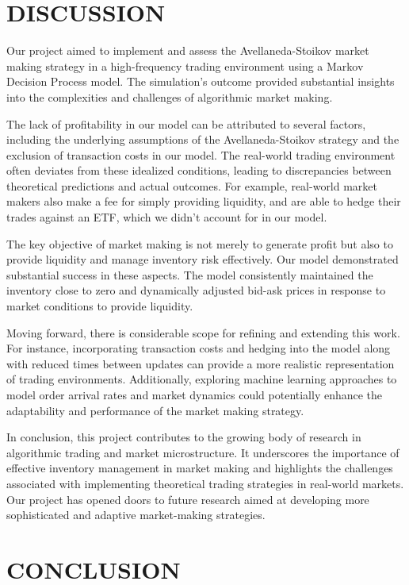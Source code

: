 \documentclass[letterpaper, 10 pt, conference]{ieeeconf}  %
\begin{document}
\section{DISCUSSION}

Our project aimed to implement and assess the Avellaneda-Stoikov market making strategy in a high-frequency trading environment using a Markov Decision Process model. The simulation's outcome provided substantial insights into the complexities and challenges of algorithmic market making.

The lack of profitability in our model can be attributed to several factors, including the underlying assumptions of the Avellaneda-Stoikov strategy and the exclusion of transaction costs in our model. The real-world trading environment often deviates from these idealized conditions, leading to discrepancies between theoretical predictions and actual outcomes. For example, real-world market makers also make a fee for simply providing liquidity, and are able to hedge their trades against an ETF, which we didn't account for in our model. 

The key objective of market making is not merely to generate profit but also to provide liquidity and manage inventory risk effectively. Our model demonstrated substantial success in these aspects. The model consistently maintained the inventory close to zero and dynamically adjusted bid-ask prices in response to market conditions to provide liquidity. 

Moving forward, there is considerable scope for refining and extending this work. For instance, incorporating transaction costs and hedging into the model along with reduced times between updates can provide a more realistic representation of trading environments. Additionally, exploring machine learning approaches to model order arrival rates and market dynamics could potentially enhance the adaptability and performance of the market making strategy.

In conclusion, this project contributes to the growing body of research in algorithmic trading and market microstructure. It underscores the importance of effective inventory management in market making and highlights the challenges associated with implementing theoretical trading strategies in real-world markets. Our project has opened doors to future research aimed at developing more sophisticated and adaptive market-making strategies.


\section{CONCLUSION}
\end{document}
